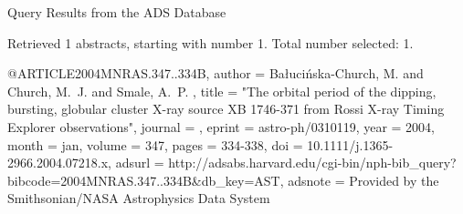 Query Results from the ADS Database


Retrieved 1 abstracts, starting with number 1.  Total number selected: 1.

@ARTICLE{2004MNRAS.347..334B,
   author = {{Ba{\l}uci{\'n}ska-Church}, M. and {Church}, M.~J. and {Smale}, A.~P.
	},
    title = "{The orbital period of the dipping, bursting, globular cluster X-ray source XB 1746-371 from Rossi X-ray Timing Explorer observations}",
  journal = {\mnras},
   eprint = {astro-ph/0310119},
     year = 2004,
    month = jan,
   volume = 347,
    pages = {334-338},
      doi = {10.1111/j.1365-2966.2004.07218.x},
   adsurl = {http://adsabs.harvard.edu/cgi-bin/nph-bib_query?bibcode=2004MNRAS.347..334B&db_key=AST},
  adsnote = {Provided by the Smithsonian/NASA Astrophysics Data System}
}


